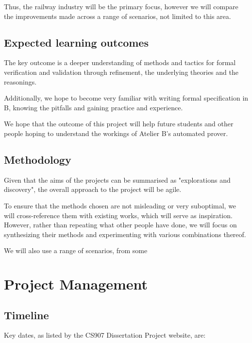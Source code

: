 \documentclass[11pt,journal]{IEEEtran}
\begin{document}
	Thus, the railway industry will be the primary focus, however we will compare the improvements made across a range of scenarios, not limited to this area.
	
	\subsection{Expected learning outcomes}
	The key outcome is a deeper understanding of methods and tactics for formal verification and validation through refinement, the underlying theories and the reasonings. 
	
	Additionally, we hope to become very familiar with writing formal specification in B, knowing the pitfalls and gaining practice and experience.	
	
	We hope that the outcome of this project will help future students and other people hoping to understand the workings of Atelier B's automated prover.
		
	\subsection{Methodology}

	Given that the aims of the projects can be summarised as "explorations and discovery", the overall approach to the project will be agile. 
	
	To ensure that the methods chosen are not misleading or very suboptimal, we will cross-reference them with existing works, which will serve as inspiration. However, rather than repeating what other people have done, we will focus on synthesizing their methods and experimenting with various combinations thereof. 
	
	We will also use a range of scenarios, from some 
	
	\section{Project Management}

	
	\subsection{Timeline}
	Key dates, as listed by the CS907 Dissertation Project website, are:
\end{document}
